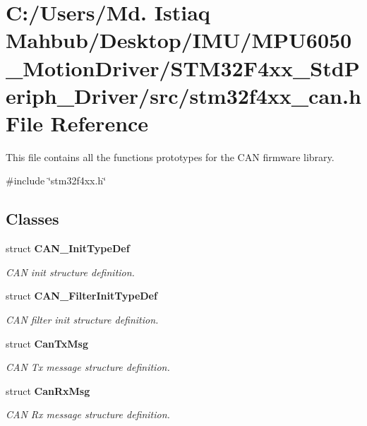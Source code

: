 \section{C\+:/\+Users/\+Md. Istiaq Mahbub/\+Desktop/\+I\+M\+U/\+M\+P\+U6050\+\_\+\+Motion\+Driver/\+S\+T\+M32\+F4xx\+\_\+\+Std\+Periph\+\_\+\+Driver/src/stm32f4xx\+\_\+can.h File Reference}
\label{stm32f4xx__can_8h}


This file contains all the functions prototypes for the C\+AN firmware library.  


{\ttfamily \#include \char`\"{}stm32f4xx.\+h\char`\"{}}\newline
\subsection*{Classes}
\begin{DoxyCompactItemize}
\item 
struct \textbf{ C\+A\+N\+\_\+\+Init\+Type\+Def}
\begin{DoxyCompactList}\small\item\em C\+AN init structure definition. \end{DoxyCompactList}\item 
struct \textbf{ C\+A\+N\+\_\+\+Filter\+Init\+Type\+Def}
\begin{DoxyCompactList}\small\item\em C\+AN filter init structure definition. \end{DoxyCompactList}\item 
struct \textbf{ Can\+Tx\+Msg}
\begin{DoxyCompactList}\small\item\em C\+AN Tx message structure definition. \end{DoxyCompactList}\item 
struct \textbf{ Can\+Rx\+Msg}
\begin{DoxyCompactList}\small\item\em C\+AN Rx message structure definition. \end{DoxyCompactList}\end{DoxyCompactItemize}
